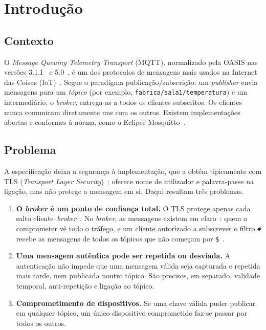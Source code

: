 \section{Introdução}
\label{sec:introducao}

\subsection{Contexto}

O \emph{Message Queuing Telemetry Transport} (MQTT), normalizado pela OASIS nas
versões 3.1.1~\cite{oasis-mqtt311} e 5.0~\cite{oasis-mqtt5}, é um dos protocolos
de mensagens mais usados na Internet das Coisas (IoT)~\cite{vanglabbeek2022flexible}. Segue o paradigma
publicação/subscrição: um \emph{publisher} envia mensagens para um \emph{tópico}
(por exemplo, \texttt{fabrica/sala1/temperatura}) e um intermediário, o
\emph{broker}, entrega-as a todos os clientes subscritos. Os clientes nunca
comunicam diretamente uns com os outros. Existem implementações abertas e conformes
à norma, como o Eclipse Mosquitto~\cite{light2017mosquitto}.

\subsection{Problema}

A especificação deixa a segurança à implementação, que a obtém tipicamente com
TLS (\emph{Transport Layer Security})~\cite[§5]{oasis-mqtt311}; oferece nome de utilizador e palavra-passe na
ligação, mas não protege a mensagem em si. Daqui
resultam três problemas.

\begin{enumerate}[label=\textbf{P\arabic*.}, leftmargin=*]
  \item \textbf{O \emph{broker} é um ponto de confiança total.} O TLS protege
    apenas cada salto cliente--\emph{broker}~\cite{rfc8446}. No \emph{broker}, as
    mensagens existem em claro~\cite{segarra2020mqttz}: quem o comprometer vê todo o
    tráfego, e um cliente autorizado a subscrever o filtro \texttt{\#} recebe as
    mensagens de todos os tópicos que não começam por
    \texttt{\$}~\cite[§4.7]{oasis-mqtt311}.
  \item \textbf{Uma mensagem autêntica pode ser repetida ou desviada.} A
    autenticação não impede que uma mensagem válida seja capturada e repetida mais
    tarde, nem publicada noutro tópico. São precisos, em separado, validade
    temporal, anti-repetição e ligação ao tópico.
  \item \textbf{Comprometimento de dispositivos.} Se uma chave válida puder
    publicar em qualquer tópico, um único dispositivo comprometido faz-se passar
    por todos os outros.
\end{enumerate}

